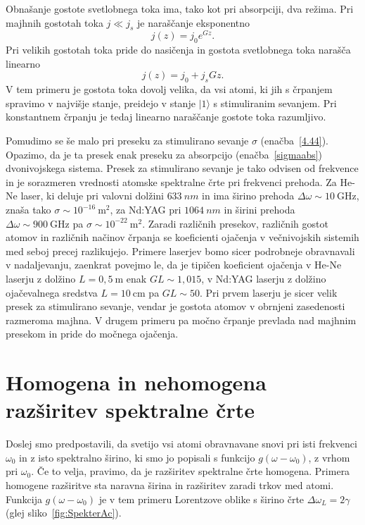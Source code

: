 Obnašanje gostote svetlobnega toka ima, tako kot pri absorpciji, dva režima. 
Pri majhnih gostotah toka $j\ll j_{s}$ je naraščanje eksponentno 
\begin{equation}
j(z)=j_{0}e^{Gz}.
\label{4.45}
\end{equation}
Pri velikih gostotah toka pride do nasičenja in gostota svetlobnega
toka narašča linearno
\begin{equation}
j(z)=j_{0}+j_{s}Gz.
\label{4.46}
\end{equation}
 V tem primeru je gostota toka dovolj velika, da vsi atomi, ki jih
s črpanjem spravimo v najvišje stanje, preidejo v stanje $|1\rangle$
s stimuliranim sevanjem. Pri konstantnem črpanju je tedaj 
linearno naraščanje gostote toka razumljivo. 

Pomudimo se še malo pri preseku za stimulirano sevanje $\sigma$
 (enačba~\ref{4.44}). Opazimo, da je ta presek enak preseku za
absorpcijo (enačba~\ref{sigmaabs}) dvonivojskega sistema. 
Presek za stimulirano
sevanje je tako odvisen od frekvence in je sorazmeren vrednosti atomske spektralne 
črte pri frekvenci prehoda. Za He-Ne laser, 
ki deluje pri valovni dolžini $633~\si{nm}$ in ima 
širino prehoda $\Delta \omega \sim 10~\si{\giga\hertz}$, znaša tako  $\sigma \sim 10^{-16}~\si{\metre}^2$, 
za Nd:YAG pri $1064~\si{nm}$ in širini prehoda 
$\Delta \omega \sim 900~\si{\giga\hertz}$ pa  $\sigma \sim 10^{-22}~\si{\metre}^2$.
Zaradi različnih presekov, različnih gostot atomov in različnih načinov črpanja se 
koeficienti ojačenja v večnivojskih sistemih med seboj precej razlikujejo. Primere 
laserjev bomo sicer podrobneje obravnavali v nadaljevanju, zaenkrat povejmo 
le, da je tipičen koeficient ojačenja v He-Ne laserju z dolžino $L = 0,5~\si{\metre}$
enak $GL \sim 1,015$, v Nd:YAG laserju z dolžino ojačevalnega sredstva 
$L = 10~\si{\centi\metre}$ pa $GL \sim 50$. Pri prvem laserju je sicer velik presek za stimulirano sevanje, vendar 
je gostota atomov v obrnjeni zasedenosti razmeroma majhna. V drugem primeru pa močno 
črpanje prevlada nad majhnim presekom in pride do močnega ojačenja.

\section{Homogena in nehomogena razširitev spektralne črte}
\label{Razsiritev}
Doslej smo predpostavili, da svetijo vsi atomi obravnavane snovi
pri isti frekvenci $\omega_{0}$ in z isto spektralno širino, ki smo
jo popisali s funkcijo $g(\omega-\omega_0)$, z vrhom pri $\omega_0$. Če to velja, 
pravimo, da je razširitev spektralne črte homogena. 
Primera homogene razširitve sta naravna širina in razširitev zaradi trkov med atomi. 
Funkcija $g(\omega-\omega_0)$ je v tem primeru Lorentzove oblike 
s širino črte $\Delta \omega_L = 2\gamma$ (glej sliko~\ref{fig:SpekterAc}). 

